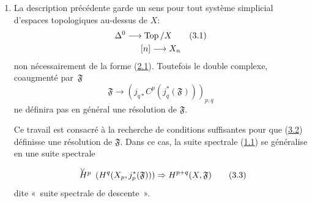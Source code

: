 \documentclass[10pt]{../fichiers-configuration-latex/smfart}
\begin{document}
\begin{enumerate}
Notons que la formation des résolutions flasques canoniques commute à
la\pageoriginale restriction à un ouvert et à l'image directe par une immersion
fermée. Dès lors:
\begin{enumerate}
\renewcommand{\theenumi}{\alph{enumi}}
\renewcommand{\labelenumi}{\theenumi)}
\item si $\Uu$ est ouvert
\begin{equation*}
\mathcal{C}^q(\Uu, C^n(\mathfrak{F})) = j_{q\ast} j_{q}^{\ast}
C^p(\mathfrak{F}) = j_{q\ast} C^p(j^{\ast}_q \mathfrak{F})\tag{2.3}
\end{equation*}
\item si $\Uu$ est fermé et localement fini
\begin{equation*}
C^p(\mathcal{C}^q(\Uu, \mathfrak{F})) = C^p(j_{q\ast} j^{\ast}_q
\mathfrak{F}) = j_{q\ast} C^p(j^{\ast}_q \mathfrak{F}){\quoi}.\tag{2.4}
\end{equation*}
\end{enumerate}
Ainsi, pour obtenir une description unifiée de (\hyperref[Vbis.subsec1.2]{1.2}) et (\hyperref[Vbis.subsec1.3]{1.3}), on voit
qu'il suffit de prendre la résolution « flasque canonique » de
$j^{\ast}_q(\mathfrak{F})$ sur $X_q$ pour tout $q$, puis d'appliquer le
foncteur $j_{q\ast}$ à cette résolution.

\item La description précédente garde un sens pour tout système simplicial
d'espaces topologiques au-dessus de $X$:
\begin{gather*}
\Delta^{0} \longrightarrow \operatorname{Top}/X\tag{3.1}\\
[n] \longrightarrow X_n\notag
\end{gather*}
non nécessairement de la forme (\hyperref[Vbis.subsec2.1]{2.1}). Toutefois le double complexe,
coaugmenté par~$\mathfrak{F}$
\begin{equation*}
\mathfrak{F} \longrightarrow (j_{q\ast} C^p
(j^{\ast}_q(\mathfrak{F})))_{p, q}\tag{3.2}
\end{equation*}
ne définira pas en général une résolution de $\mathfrak{F}$.

Ce travail est consacré à la recherche de conditions suffisantes pour
que (\hyperref[Vbis.subsec3.2]{3.2}) définisse une résolution de $\mathfrak{F}$. Dans ce cas, la
suite spectrale (\hyperref[Vbis.subsec1.1]{1.1}) se généralise en une suite spectrale
\begin{equation*}
\Hv{p} (H^q (X_p, j^{\ast}_p (\mathfrak{F}))) \Rightarrow H^{p + q} (X,
\mathfrak{F}) \tag{3.3}
\end{equation*}
dite « suite spectrale de descente ».


\end{enumerate}
\end{document}
